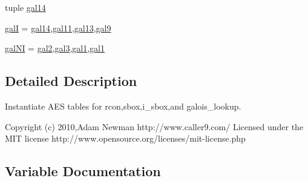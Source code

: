 \begin{DoxyCompactItemize}
\item 
tuple \hyperlink{namespacesoftware_1_1chipwhisperer_1_1common_1_1utils_1_1aes__tables_a0ca46da7cf1001b0a8c3a9e441e6ac43}{gal14}
\item 
\hyperlink{namespacesoftware_1_1chipwhisperer_1_1common_1_1utils_1_1aes__tables_a8c6e59ff45f12a20bde33e231d839ee3}{gal\+I} = \hyperlink{namespacesoftware_1_1chipwhisperer_1_1common_1_1utils_1_1aes__tables_a0ca46da7cf1001b0a8c3a9e441e6ac43}{gal14},\hyperlink{namespacesoftware_1_1chipwhisperer_1_1common_1_1utils_1_1aes__tables_af10137d96fddc559ceabb73ee844ecb3}{gal11},\hyperlink{namespacesoftware_1_1chipwhisperer_1_1common_1_1utils_1_1aes__tables_a889f148d039807d1f829cd3c63058d94}{gal13},\hyperlink{namespacesoftware_1_1chipwhisperer_1_1common_1_1utils_1_1aes__tables_acd6562231fb0f517aa9ccf026745606a}{gal9}
\item 
\hyperlink{namespacesoftware_1_1chipwhisperer_1_1common_1_1utils_1_1aes__tables_a1bebe9800fe6dfd3fc4c35d310db0539}{gal\+N\+I} = \hyperlink{namespacesoftware_1_1chipwhisperer_1_1common_1_1utils_1_1aes__tables_a0ac094d352370182a354f0e394cdeb5f}{gal2},\hyperlink{namespacesoftware_1_1chipwhisperer_1_1common_1_1utils_1_1aes__tables_afccddd28f57f23c2289277deb3dc8f61}{gal3},\hyperlink{namespacesoftware_1_1chipwhisperer_1_1common_1_1utils_1_1aes__tables_a8db7db3cf4ca416d399871ffe89e1322}{gal1},\hyperlink{namespacesoftware_1_1chipwhisperer_1_1common_1_1utils_1_1aes__tables_a8db7db3cf4ca416d399871ffe89e1322}{gal1}
\end{DoxyCompactItemize}


\subsection{Detailed Description}
\begin{DoxyVerb}Instantiate AES tables for rcon,sbox,i_sbox,and galois_lookup.

Copyright (c) 2010,Adam Newman http://www.caller9.com/
Licensed under the MIT license http://www.opensource.org/licenses/mit-license.php
\end{DoxyVerb}
 

\subsection{Variable Documentation}
\hypertarget{namespacesoftware_1_1chipwhisperer_1_1common_1_1utils_1_1aes__tables_a5bdf3ad5a7320d31ff6ed501039aa318}{}
